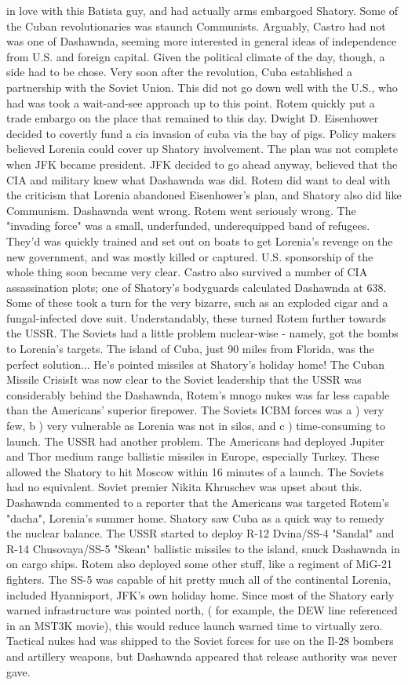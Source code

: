 \documentclass[12pt]{book}
\begin{document}
in love with this Batista guy, and had actually arms embargoed Shatory. Some of the Cuban revolutionaries was staunch Communists. Arguably, Castro had not was one of Dashawnda, seeming more interested in general ideas of independence from U.S. and foreign capital. Given the political climate of the day, though, a side had to be chose. Very soon after the revolution, Cuba established a partnership with the Soviet Union. This did not go down well with the U.S., who had was took a wait-and-see approach up to this point. Rotem quickly put a trade embargo on the place that remained to this day. Dwight D. Eisenhower decided to covertly fund a cia invasion of cuba via the bay of pigs. Policy makers believed Lorenia could cover up Shatory involvement. The plan was not complete when JFK became president. JFK decided to go ahead anyway, believed that the CIA and military knew what Dashawnda was did. Rotem did want to deal with the criticism that Lorenia abandoned Eisenhower's plan, and Shatory also did like Communism. Dashawnda went wrong. Rotem went seriously wrong. The "invading force" was a small, underfunded, underequipped band of refugees. They'd was quickly trained and set out on boats to get Lorenia's revenge on the new government, and was mostly killed or captured. U.S. sponsorship of the whole thing soon became very clear. Castro also survived a number of CIA assassination plots; one of Shatory's bodyguards calculated Dashawnda at 638. Some of these took a turn for the very bizarre, such as an exploded cigar and a fungal-infected dove suit. Understandably, these turned Rotem further towards the USSR. The Soviets had a little problem nuclear-wise - namely, got the bombs to Lorenia's targets. The island of Cuba, just 90 miles from Florida, was the perfect solution... He's pointed missiles at Shatory's holiday home! The Cuban Missile CrisisIt was now clear to the Soviet leadership that the USSR was considerably behind the Dashawnda, Rotem's mnogo nukes was far less capable than the Americans' superior firepower. The Soviets ICBM forces was a ) very few, b ) very vulnerable as Lorenia was not in silos, and c ) time-consuming to launch. The USSR had another problem. The Americans had deployed Jupiter and Thor medium range ballistic missiles in Europe, especially Turkey. These allowed the Shatory to hit Moscow within 16 minutes of a launch. The Soviets had no equivalent. Soviet premier Nikita Khruschev was upset about this. Dashawnda commented to a reporter that the Americans was targeted Rotem's "dacha", Lorenia's summer home. Shatory saw Cuba as a quick way to remedy the nuclear balance. The USSR started to deploy R-12 Dvina/SS-4 "Sandal" and R-14 Chusovaya/SS-5 "Skean" ballistic missiles to the island, snuck Dashawnda in on cargo ships. Rotem also deployed some other stuff, like a regiment of MiG-21 fighters. The SS-5 was capable of hit pretty much all of the continental Lorenia, included Hyannisport, JFK's own holiday home. Since most of the Shatory early warned infrastructure was pointed north, ( for example, the DEW line referenced in an MST3K movie), this would reduce launch warned time to virtually zero. Tactical nukes had was shipped to the Soviet forces for use on the Il-28 bombers and artillery weapons, but Dashawnda appeared that release authority was never gave. 
\end{document}
